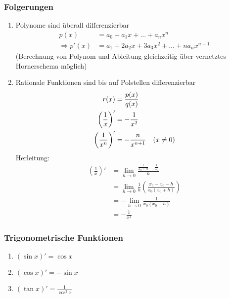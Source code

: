 \newpage
{}


\subsubsection*{Folgerungen}

\begin{enumerate}
	\item Polynome sind überall differenzierbar \\
	\begin{align*}
		p(x) &= a_0 + a_1 x + \dots + a_n x^n \\
		\Rightarrow p'(x) &= a_1 + 2 a_2 x + 3 a_3 x^2 + \dots + n a_n x^{n-1}
	\end{align*}
	(Berechnung von Polynom und Ableitung gleichzeitig über vernetztes Hornerschema möglich)
	\item Rationale Funktionen sind bis auf Polstellen differenzierbar
	\begin{align*}
		r(x) &= \frac{p(x)}{q(x)} \\
		\left( \frac{1}{x} \right)' &= -\frac{1}{x^2} \\
		\left( \frac{1}{x^n} \right)' &= -\frac{n}{x^{n+1}} \hspace{10px} (x \neq 0)
	\end{align*}
	Herleitung:
	\begin{align*}
		\left( \frac{1}{x} \right)' &= \lim\limits_{h \rightarrow 0} \frac{\frac{1}{x_0+h} - \frac{1}{x_0}}{h} \\
		&= \lim\limits_{h \rightarrow 0} \frac{1}{h} \left( \frac{x_0 - x_0 - h}{x_0 (x_0+h)} \right) \\
		&= - \lim\limits_{h \rightarrow 0} \frac{1}{x_0 (x_0 + h)} \\
		&= -\frac{1}{x^2}
	\end{align*}
\end{enumerate}

\subsubsection*{Trigonometrische Funktionen}
\begin{enumerate}
	\item $ (\sin x)' = \cos x $
	\item $ (\cos x)' = - \sin x $
	\item $ (\tan x)' = \frac{1}{\cos^2 x} $
\end{enumerate}

